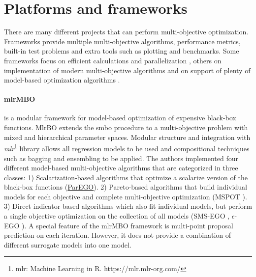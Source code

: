 
    \section{Platforms and frameworks}
        There are many different projects that can perform multi-objective optimization. Frameworks provide multiple multi-objective algorithms, performance metrics, built-in test problems and extra tools such as plotting and benchmarks. Some frameworks focus on efficient calculations and parallelization \cite{francesco_biscani_2019}, others on implementation of modern multi-objective algorithms \cite{benitezhidalgo2019jmetalpy, TianPlatEMO} and on support of plenty of model-based optimization algorithms \cite{BischlmlrMBO}.

        \paragraph{mlrMBO}\cite{BischlmlrMBO} is a modular framework for model-based optimization of expensive black-box functions. MlrBO extends the \gls{smbo} procedure to a multi-objective problem with mixed and hierarchical parameter spaces. Modular structure and integration with \emph{mlr}\footnote{{mlr}: Machine Learning in R. https://mlr.mlr-org.com/} library allows all regression models to be used and compositional techniques such as bagging and ensembling to be applied. The authors implemented four different model-based multi-objective algorithms that are categorized in three classes: 1) Scalarization-based algorithms that optimize a scalarize version of the black-box functions (\hyperref[alg:ParEGO]{ParEGO}). 2) Pareto-based algorithms that build individual models for each objective and complete multi-objective optimization (MSPOT \cite{ZaeffererBNWE13}). 3) Direct indicator-based algorithms which also fit individual models, but perform a single objective optimization on the collection of all models (SMS-EGO \cite{inproceedings}, $\epsilon$-EGO \cite{WagEGOe}).
        A special feature of the mlrMBO framework is multi-point proposal prediction on each iteration. However, it does not provide a combination of different surrogate models into one model.
       
